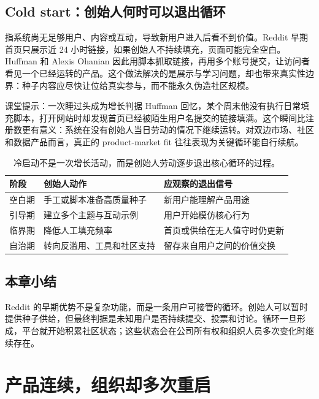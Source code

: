 \documentclass[a4paper]{article}
\begin{document}
\subsection{Cold start：创始人何时可以退出循环}

 指系统尚无足够用户、内容或互动，导致新用户进入后看不到价值。Reddit 早期首页只展示近 24 小时链接，如果创始人不持续填充，页面可能完全空白。Huffman 和 Alexis Ohanian 因此用脚本抓取链接，再用多个账号提交，让访问者看见一个已经运转的产品。这个做法解决的是展示与学习问题，却也带来真实性边界：种子内容应尽快让位给真实参与，而不能永久伪造社区规模。

\begin{knowledgebox}{课堂提示：一次睡过头成为增长判据}
Huffman 回忆，某个周末他没有执行日常填充脚本，打开网站时却发现首页已经被陌生用户名提交的链接填满。这个瞬间比注册数更有意义：系统在没有创始人当日劳动的情况下继续运转。对双边市场、社区和数据产品而言，真正的 product-market fit 往往表现为关键循环能自行续航。
\end{knowledgebox}

\begin{table}[H]
\centering
\begin{tabular}{L{0.2\textwidth}L{0.31\textwidth}L{0.39\textwidth}}
\toprule
阶段 & 创始人动作 & 应观察的退出信号 \\
\midrule
空白期 & 手工或脚本准备高质量种子 & 新用户能理解产品用途 \\
引导期 & 建立多个主题与互动示例 & 用户开始模仿核心行为 \\
临界期 & 降低人工填充频率 & 首页或供给在无人值守时仍更新 \\
自治期 & 转向反滥用、工具和社区支持 & 留存来自用户之间的价值交换 \\
\bottomrule
\end{tabular}
\caption{冷启动不是一次增长活动，而是创始人劳动逐步退出核心循环的过程。}
\end{table}

\subsection{本章小结}

Reddit 的早期优势不是复杂功能，而是一条用户可接管的循环。创始人可以暂时提供种子供给，但最终判据是未知用户是否持续提交、投票和讨论。循环一旦形成，平台就开始积累社区状态；这些状态会在公司所有权和组织人员多次变化时继续存在。

\section{产品连续，组织却多次重启}
\end{document}
